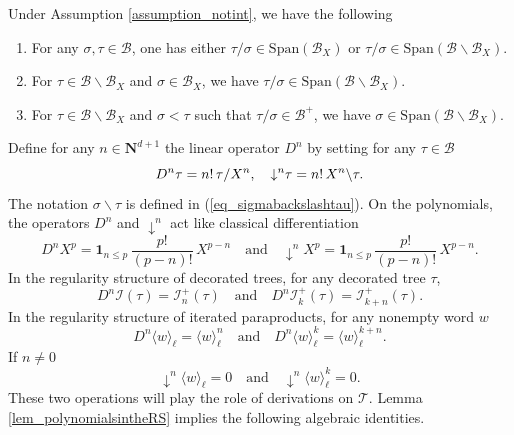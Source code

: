 \documentclass[11pt]{preprint}
\newcommand{\mcB}{\mathcal{B}}
\newcommand{\mcI}{\mathcal{I}}
\def\eqref#1{(\ref{#1})}
\renewcommand{\lg}{\langle}
\newcommand{\rg}{\rangle}
\newcommand{\bfN}{\mathbf{N}}
\newcommand{\scrT}{\mathscr{T}}
\begin{document}
	\begin{lemma}\label{lem_polynomialsintheRS}
		Under Assumption \ref{assumption_notint}, we have the following
		\begin{enumerate}
			\item For any $\sigma,\tau\in\mcB$, one has either $\tau/\sigma\in \text{Span}(\mcB_X)$ or $\tau/\sigma\in \text{Span}(\mcB \backslash \mcB_X)$.
			\item For $\tau\in\mcB\backslash \mcB_X$ and $\sigma\in\mcB_X$, we have  $\tau/\sigma\in \text{Span}(\mcB \backslash \mcB_X)$.
			\item For $\tau\in\mcB\backslash \mcB_X$ and $\sigma<\tau$ such that $\tau/\sigma\in \mcB^+$, we have $\sigma\in \text{Span}(\mcB \backslash \mcB_X)$.
		\end{enumerate}
	\end{lemma}
		Define for any $n\in\bfN^{d+1}$ the linear operator $D^n$ by setting for any $\tau\in\mcB$
	\begin{equation}  \label{linear_operator}
		D^n\tau = n!  \, \tau / X^n, \quad 
		\downarrow^n\hspace{-3pt}\tau =  n!\, X^n \backslash \tau.
	\end{equation}
	The notation $\sigma\backslash \tau$ is defined in \eqref{eq_sigmabackslashtau}. On the polynomials, the operators $D^n$ and $\downarrow^n$ act like classical differentiation
		$$
		D^n X^p = \mathbf{1}_{n\leq p}\, \frac{p!}{(p-n)!} \, X^{p-n}  \quad \text{and} \quad \downarrow^n X^p = \mathbf{1}_{n\leq p}\, \frac{p!}{(p-n)!} \, X^{p-n}.
		$$
	 In the regularity structure of decorated trees, for any decorated tree $\tau$,
		$$
		D^n \mcI(\tau) = \mcI_{n}^+(\tau)  \quad  \text{and} \quad 	D^n \mcI_{k}^+ (\tau) = \mcI_{k+n}^+(\tau).
		$$
	 In the regularity structure of iterated paraproducts, for any nonempty word $w$
		$$
		D^n \lg w\rg_\ell = \lg w \rg_\ell^{n} \quad \text{and} \quad D^n \lg w\rg_\ell^k = \lg w \rg_\ell^{k+n}.
		$$
		If $n\ne 0$
		$$
			\downarrow^n \lg w\rg_\ell = 0 \quad \text{and} \quad \downarrow^n \lg w\rg_\ell^k =0.
		$$
	These two operations will play the role of derivations on  $\scrT$. Lemma \ref{lem_polynomialsintheRS} implies the following algebraic identities.
\end{document}
